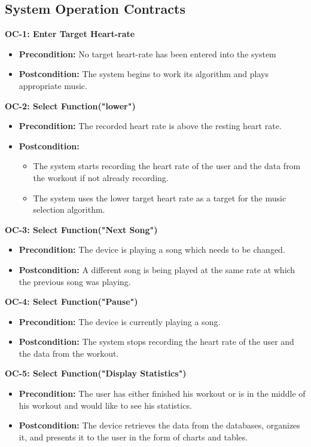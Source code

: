 \documentclass[letterpaper,english, 12pt]{scrreprt}
\begin{document}
\subsection{System Operation Contracts}
{\bf OC-1: Enter Target Heart-rate}
\begin{itemize}
	\item {\bf Precondition: } No target heart-rate has been entered into the system
	\item {\bf Postcondition: } The system begins to work its algorithm and plays appropriate music.
\end{itemize}

{\bf OC-2: Select Function("lower")}
\begin{itemize}
	\item {\bf Precondition: } The recorded heart rate is above the resting heart rate.
	\item {\bf Postcondition: } 
		\begin{itemize}
			\item The system starts recording the heart rate of the user and the data from the workout if not already recording.
			\item The system uses the lower target heart rate as a target for the music selection algorithm.
		\end{itemize}

\end{itemize}

{\bf OC-3: Select Function("Next Song")}
\begin{itemize}
	\item {\bf Precondition: } The device is playing a song which needs to be changed.
	\item {\bf Postcondition: } A different song is being played at the same rate at which the previous song was playing.

\end{itemize}

{\bf OC-4: Select Function("Pause")}
\begin{itemize}
	\item {\bf Precondition: } The device is currently playing a song.
	\item {\bf Postcondition: } The system stops recording the heart rate of the user and the data from the workout.

\end{itemize}

{\bf OC-5: Select Function("Display Statistics")}
\begin{itemize}
	\item {\bf Precondition: } The user has either finished his workout or is in the middle of his workout and would like to see his statistics.
	\item {\bf Postcondition: } The device retrieves the data from the databases, organizes it, and presents it to the user in the form of charts and tables.
\end{itemize}
\end{document}
